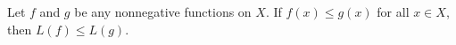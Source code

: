 Let $f$ and $g$ be any nonnegative functions on $X$. If $f(x) \leq g(x)$ for all $x \in X$, then $L(f) \leq L(g)$.
